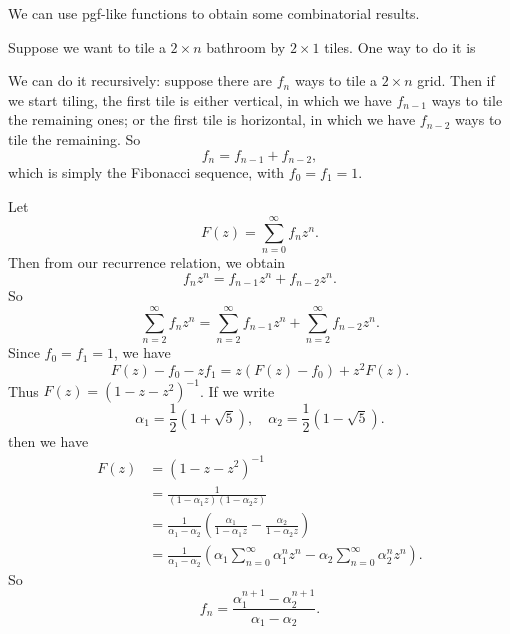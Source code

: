 \documentclass[a4paper]{article}
\begin{document}
We can use pgf-like functions to obtain some combinatorial results.
\begin{eg}
  Suppose we want to tile a $2\times n$ bathroom by $2\times 1$ tiles. One way to do it is
  \begin{center}
  \end{center}
  We can do it recursively: suppose there are $f_n$ ways to tile a $2\times n$ grid. Then if we start tiling, the first tile is either vertical, in which we have $f_{n - 1}$ ways to tile the remaining ones; or the first tile is horizontal, in which we have $f_{n - 2}$ ways to tile the remaining. So
  \[
    f_n = f_{n - 1} + f_{n - 2},
  \]
  which is simply the Fibonacci sequence, with $f_0 = f_1 = 1$.

  Let
  \[
    F(z) = \sum_{n = 0}^\infty f_nz^n.
  \]
  Then from our recurrence relation, we obtain
  \[
    f_nz^n = f_{n - 1}z^n + f_{n - 2}z^n.
  \]
  So
  \[
    \sum_{n = 2}^\infty f_n z^n = \sum_{n = 2}^{\infty} f_{n - 1}z^n + \sum_{n = 2}^\infty f_{n - 2}z^n.
  \]
  Since $f_0 = f_1 = 1$, we have
  \[
    F(z) - f_0 - zf_1 = z(F(z) - f_0) + z^2F(z).
  \]
  Thus $F(z) = (1 - z - z^2)^{-1}$. If we write
  \[
    \alpha_1 = \frac{1}{2}(1 + \sqrt{5}),\quad \alpha_2 = \frac{1}{2}(1 - \sqrt{5}).
  \]
  then we have
  \begin{align*}
    F(z) &= (1 - z - z^2)^{-1}\\
    &= \frac{1}{(1 - \alpha_1 z)(1 - \alpha_2 z)}\\
    &= \frac{1}{\alpha_1 - \alpha_2}\left(\frac{\alpha_1}{1 - \alpha_1 z} - \frac{\alpha_2}{1 - \alpha_2 z}\right)\\
    &= \frac{1}{\alpha_1 - \alpha_2}\left(\alpha_1 \sum_{n = 0}^\infty \alpha_1^nz^n - \alpha_2\sum_{n = 0}^\infty \alpha_2^n z^n\right).
  \end{align*}
  So
  \[
    f_n = \frac{\alpha_1^{n + 1} - \alpha_2^{n + 1}}{\alpha_1 - \alpha_2}.
  \]
\end{eg}
\end{document}
